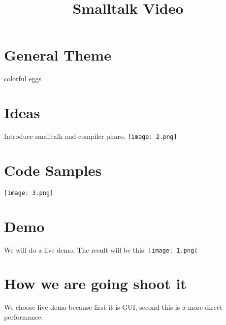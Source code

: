 \documentclass{article}
\title{Smalltalk Video}
\begin{document}
\maketitle

\section{General Theme}
colorful eggs

\section{Ideas}
Introduce smalltalk and compiler pharo.
\texttt{[image: 2.png]}

\section{Code Samples}
\texttt{[image: 3.png]}

\section{Demo}
We will do a live demo. The result will be this:
\texttt{[image: 1.png]}

\section{How we are going shoot it}
We choose live demo because first it is GUI, second this is a more direct performance.
\end{document}
